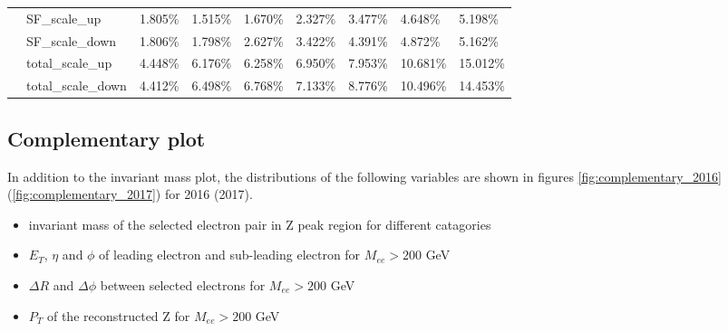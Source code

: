 \begin{table}[htp]
\begin{center}
{\begin{tabular}{|l|l|l|l|l|l|l|l|l|}
&SF\_scale\_up               & 1.805\%        & 1.515\%        & 1.670\%        & 2.327\%        & 3.477\%        & 4.648\%        & 5.198\%        \\\cline{2-9}
&SF\_scale\_down             & 1.806\%        & 1.798\%        & 2.627\%        & 3.422\%        & 4.391\%        & 4.872\%        & 5.162\%        \\\cline{2-9}
&total\_scale\_up            & 4.448\%        & 6.176\%        & 6.258\%        & 6.950\%        & 7.953\%        & 10.681\%        & 15.012\%      \\\cline{2-9}
&total\_scale\_down          & 4.412\%        & 6.498\%        & 6.768\%        & 7.133\%        & 8.776\%        & 10.496\%        & 14.453\%      \\\hline

\end{tabular}}
\end{center}
\end{table}




\subsection{Complementary plot}
In addition to the invariant mass plot, the distributions of the following variables are shown in figures \ref{fig:complementary_2016} (\ref{fig:complementary_2017}) for 2016 (2017).
\begin{itemize}
  \item invariant mass of the selected electron pair in Z peak region for different catagories
  \item $E_{T}$, $\eta$ and $\phi$ of leading electron and sub-leading electron for $M_{ee}>200$ GeV
  \item $\Delta R$ and $\Delta\phi$ between selected electrons for $M_{ee}>200$ GeV
  \item $P_{T}$ of the reconstructed Z for $M_{ee}>200$ GeV
\end{itemize}



